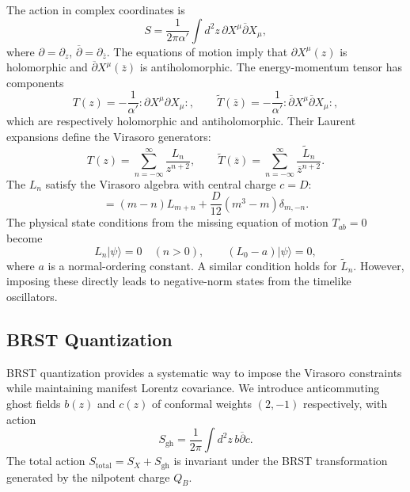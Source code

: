 \documentclass[11pt]{article}
\renewcommand{\tilde}{\widetilde}
\renewcommand{\bar}{\overline}
\begin{document}
The action in complex coordinates is
\begin{equation}
S = \frac{1}{2\pi\alpha'} \int d^2z \, \partial X^\mu \bar{\partial} X_\mu,
\end{equation}
where $\partial = \partial_z$, $\bar{\partial} = \partial_{\bar{z}}$. The equations of motion imply that $\partial X^\mu(z)$ is holomorphic and $\bar{\partial} X^\mu(\bar{z})$ is antiholomorphic. The energy-momentum tensor has components
\begin{equation}
T(z) = -\frac{1}{\alpha'} :\partial X^\mu \partial X_\mu:, \qquad \tilde{T}(\bar{z}) = -\frac{1}{\alpha'} :\bar{\partial} X^\mu \bar{\partial} X_\mu:,
\end{equation}
which are respectively holomorphic and antiholomorphic. Their Laurent expansions define the Virasoro generators:
\begin{equation}
T(z) = \sum_{n=-\infty}^{\infty} \frac{L_n}{z^{n+2}}, \qquad \tilde{T}(\bar{z}) = \sum_{n=-\infty}^{\infty} \frac{\tilde{L}_n}{\bar{z}^{n+2}}.
\end{equation}
The $L_n$ satisfy the Virasoro algebra with central charge $c = D$:
\begin{equation}
[L_m, L_n] = (m-n)L_{m+n} + \frac{D}{12}(m^3-m)\delta_{m,-n}.
\end{equation}
The physical state conditions from the missing equation of motion $T_{ab}=0$ become
\begin{equation}
L_n |\psi\rangle = 0 \quad (n>0), \qquad (L_0 - a)|\psi\rangle = 0,
\end{equation}
where $a$ is a normal-ordering constant. A similar condition holds for $\tilde{L}_n$. However, imposing these directly leads to negative-norm states from the timelike oscillators.

\subsection{BRST Quantization}

BRST quantization provides a systematic way to impose the Virasoro constraints while maintaining manifest Lorentz covariance. We introduce anticommuting ghost fields $b(z)$ and $c(z)$ of conformal weights $(2,-1)$ respectively, with action
\begin{equation}
S_{\text{gh}} = \frac{1}{2\pi} \int d^2z \, b \bar{\partial} c.
\end{equation}
The total action $S_{\text{total}} = S_X + S_{\text{gh}}$ is invariant under the BRST transformation generated by the nilpotent charge $Q_B$.
\end{document}
